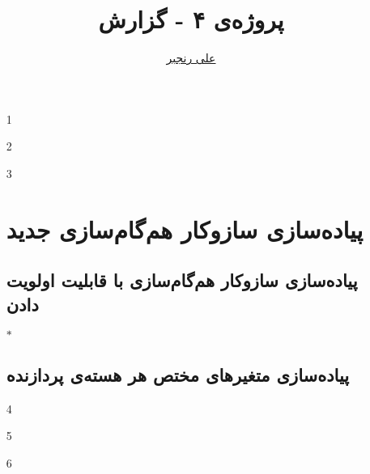 \documentclass[logo=images/logo.png]{tehranReport}
\title{پروژه‌ی ۴ - گزارش}
\author{\href{mailto:ranjbar.ali@ut.ac.ir?subject=[OS\%20S99 L1]\%20}{علی رنجبر}}
\begin{document}
	\maketitlepage
	\begin{enumerate}
	\section*{هم‌گام‌سازی در }
		\item[1]
		
		\item[2]
		
		\item[3]
		
		
	\section*{پیاده‌سازی سازوکار هم‌گام‌سازی جدید}
	\subsection*{پیاده‌سازی سازوکار هم‌گام‌سازی با قابلیت اولویت دادن}
		\item[$*$]
		
	\subsection*{پیاده‌سازی متغیرهای مختص هر هسته‌ی پردازنده}
		\item[4]
		
		\item[5]
		
		\item[6]
		
	\end{enumerate}
	
\end{document}
